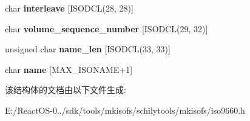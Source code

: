 \begin{DoxyCompactItemize}
char {\bfseries interleave} \mbox{[}I\+S\+O\+D\+CL(28, 28)\mbox{]}
\item 
\mbox{\label{structiso__directory__record_a1d5dd56489966b43e979233615784040}} 
char {\bfseries volume\+\_\+sequence\+\_\+number} \mbox{[}I\+S\+O\+D\+CL(29, 32)\mbox{]}
\item 
\mbox{\label{structiso__directory__record_a10becaa9e7ad0df32618dae7f5066d5f}} 
unsigned char {\bfseries name\+\_\+len} \mbox{[}I\+S\+O\+D\+CL(33, 33)\mbox{]}
\item 
\mbox{\label{structiso__directory__record_a5cad80eed8f123c0e6338914d738ece3}} 
char {\bfseries name} \mbox{[}M\+A\+X\+\_\+\+I\+S\+O\+N\+A\+ME+1\mbox{]}
\end{DoxyCompactItemize}


该结构体的文档由以下文件生成\+:\begin{DoxyCompactItemize}
\item 
E\+:/\+React\+O\+S-\/0../sdk/tools/mkisofs/schilytools/mkisofs/iso9660.\+h\end{DoxyCompactItemize}
